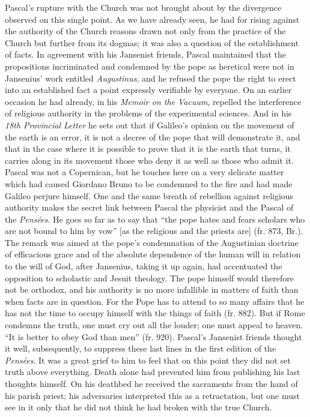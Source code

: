 \documentclass[12pt,a4paper]{article}
\newcommand{\opage}[1]{\marginnote{\footnotesize\textit{[#1]}}}
\begin{document}
Pascal's rupture with the Church was not brought about by the divergence
observed on this single point. As we have already seen, he had for rising
against the authority of the Church reasons drawn not only from the practice of
the Church but further from its dogmas; it was also a question of the
establishment of facts. In agreement with his Jansenist friends, Pascal
maintained that the propositions incriminated and condemned by the pope as
heretical were not in Jansenius' work entitled \emph{Augustinus}, and he refused
the pope the right to erect into an established fact a point expressly
verifiable by everyone. On an earlier occasion he had already, in his
\emph{Memoir on the Vacuum}, repelled the interference of religious authority in
the problems of the experimental sciences. And in his \emph{18th Provincial
Letter} he sets out that if Galileo's opinion on the movement of the earth is an
error, it is not a decree of the pope that will demonstrate it, and that in the
case where it is possible to prove that it is the earth that turns, it carries
along in its movement those who deny it as well as those who admit it. Pascal
was not a Copernican, but he touches here on a very delicate matter which had
caused Giordano Bruno to be condemned to the fire and had made Galileo perjure
himself. One and the same breath of rebellion against religious authority makes
the secret link between Pascal the physicist and the Pascal of the
\emph{Pensées}. He goes so far as to say that ``the pope hates and fears
scholars who are not bound to him by vow'' [as the religious and the priests
are] (fr. 873, Br.). The remark was aimed at the pope's condemnation of the
Augustinian doctrine of efficacious grace and of the absolute dependence of the
human will in relation to the will of God, after Jansenius, taking it up again,
had accentuated the opposition to scholastic and Jesuit theology. The pope
himself would therefore not be orthodox, and his authority is no more infallible
in matters of faith than when facts are in question. For the Pope has to attend
to so many affairs that he has not the time to occupy himself with the things of
faith
\opage{239}(fr. 882). But if Rome condemns the truth, one must cry out all the louder; one
must appeal to heaven. ``It is better to obey God than men'' (fr. 920). Pascal's
Jansenist friends thought it well, subsequently, to suppress these last lines in
the first edition of the \emph{Pensées}. It was a great grief to him to feel
that on this point they did not set truth above everything. Death alone had
prevented him from publishing his last thoughts himself. On his deathbed he
received the sacraments from the hand of his parish priest; his adversaries
interpreted this as a retractation, but one must see in it only that he did not
think he had broken with the true Church.
\end{document}
